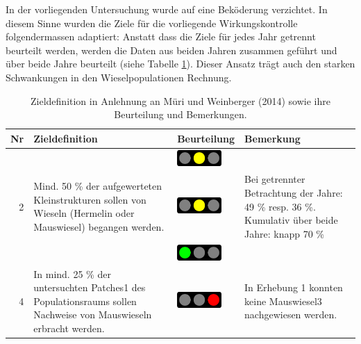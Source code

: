 \documentclass[
  oneside]{scrbook}
\begin{document}
In der vorliegenden Untersuchung wurde auf eine Beköderung verzichtet. In diesem Sinne wurden die Ziele für die vorliegende Wirkungskontrolle folgendermassen adaptiert: Anstatt dass die Ziele für jedes Jahr getrennt beurteilt werden, werden die Daten aus beiden Jahren zusammen geführt und über beide Jahre beurteilt (siehe Tabelle \ref{tab:winziele}). Dieser Ansatz trägt auch den starken Schwankungen in den Wieselpopulationen Rechnung.

\begin{table}

\caption{\label{tab:winziele}Zieldefinition in Anlehnung an Müri und Weinberger (2014) sowie ihre Beurteilung und Bemerkungen.}
\centering
\begin{tabular}[t]{rp{65mm}>{}lp{60mm}}
\toprule
Nr & Zieldefinition & Beurteilung & Bemerkung\\
\midrule
\cellcolor{gray!6}{1} & \cellcolor{gray!6}{In jedem Populationsraum sollen zu jeder Kontrollperiode Mauswiesel und Hermelin nachgewiesen werden.} & \cellcolor{gray!6}{}\includegraphics[width=0.67in, height=0.24in]{images/ampel_gelb.png} & \cellcolor{gray!6}{Es konnten zwar Hermeline, aber keine Mauswiesel nachgewiesen werden.}\\
2 & Mind. 50 \% der aufgewerteten Kleinstrukturen sollen von Wieseln (Hermelin oder Mauswiesel) begangen werden. & \includegraphics[width=0.67in, height=0.24in]{images/ampel_gelb.png} & Bei getrennter Betrachtung der Jahre: 49 \% resp. 36 \%. Kumulativ über beide Jahre: knapp 70 \%\\
\cellcolor{gray!6}{3} & \cellcolor{gray!6}{In mind. 75 \% der untersuchten Patches1 des Populationsraums sollen Nachweise von Hermelinen erbracht werden.} & \cellcolor{gray!6}{}\includegraphics[width=0.67in, height=0.24in]{images/ampel_gruen.png} & \cellcolor{gray!6}{In 10 von 11 untersuchten Patches (91 \%) konnten Nachweise von Hermelinen erbracht werden.}\\
4 & In mind. 25 \% der untersuchten Patches1 des Populationsraums sollen Nachweise von Mauswieseln erbracht werden. & \includegraphics[width=0.67in, height=0.24in]{images/ampel_rot.png} & In Erhebung 1 konnten keine Mauswiesel3 nachgewiesen werden.\\

\end{tabular}
\end{table}
\end{document}
